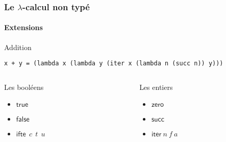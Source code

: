 \documentclass{beamer}
\newcommand{\ifte}[4]{\ensuremath{\mathsf{ifte}\:#1\: #2\:\:#3\:\: #4}}
\newcommand{\true}{\ensuremath{\mathsf{true}}}
\newcommand{\false}{\ensuremath{\mathsf{false}}}
\newcommand{\zero}{\ensuremath{\mathsf{zero}}}
\newcommand{\succs}{\ensuremath{\mathsf{succ}}}
\newcommand{\iter}{\ensuremath{\mathsf{iter}}}
\begin{document}
\begin{frame}[b,fragile]
\frametitle{Le $\lambda$-calcul non typé}
\framesubtitle{Extensions}

\begin{block}{Addition}
\begin{center}
\begin{minipage}{.9\linewidth}
\begin{lstlisting}
x + y = (lambda x (lambda y (iter x (lambda n (succ n)) y)))
\end{lstlisting}
\end{minipage}
\end{center}
\end{block}

\vfill

\begin{columns}
  \begin{column}{.45\linewidth}
    \begin{block}{Les booléens}
      \begin{itemize}
      \item $\true$ 
      \item $\false$
      \item $\ifte{}{c}{t}{u}$
      \end{itemize}
    \end{block}
  \end{column}
  \begin{column}{.45\linewidth}
    \begin{block}{Les entiers}
      \begin{itemize}
      \item $\zero$ 
      \item $\succs$ 
      \item $\iter\:n\:f\:a$ 
      \end{itemize}
    \end{block}
  \end{column}
\end{columns}

\end{frame}
\end{document}
